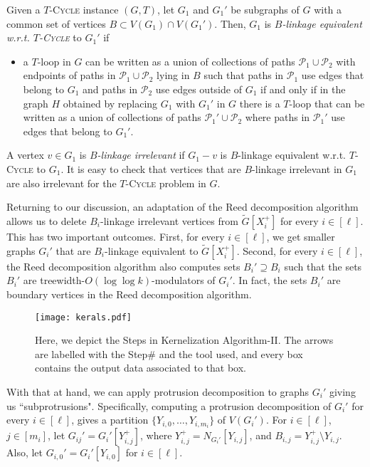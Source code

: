 \documentclass{article}
\numberwithin{claimcounter}{lemma}
\newcommand{\tcycle}{$T$-\textsc{Cycle}\xspace}
\begin{document}
 Given a \tcycle instance $(G,T)$, let $G_1$ and $G_1'$ be subgraphs of $G$ with a common set of vertices $B \subset V(G_1) \cap V(G_1')$. Then, $G_1$ is \emph{$B$-linkage equivalent  w.r.t. \tcycle} to $G_1'$ if 
\begin{itemize}
    \item a $T$-loop in $G$ can be written as a union of collections of paths $\mathcal{P}_1\cup \mathcal{P}_2$ with endpoints of paths in  $\mathcal{P}_1\cup \mathcal{P}_2$ lying in $B$ such that paths in $\mathcal{P}_1$ use edges that belong to $G_1$ and paths in $\mathcal{P}_2$ use edges outside of $G_1$ if and only if in the graph $H$ obtained by replacing $G_1$ with $G_1'$ in $G$ there is a $T$-loop that can be written as a  union of collections of paths $\mathcal{P}_1'\cup \mathcal{P}_2$ where paths in $\mathcal{P}_1'$ use edges that belong to $G_1'$.
\end{itemize}

    A vertex $v \in G_1$ is \emph{$B$-linkage irrelevant} if $G_1 - v$ is $B$-linkage equivalent w.r.t. \tcycle to $G_1$. It is easy to check that vertices that are $B$-linkage irrelevant in $G_1$ are also irrelevant for the \tcycle problem in $G$.

Returning to our discussion, an adaptation of the Reed decomposition algorithm allows us to delete $B_i$-linkage irrelevant vertices from $\tilde{G}[X_i^+]$ for every $i\in[\ell]$. This has two important outcomes. First, for every $i\in[\ell]$, we get smaller graphs $G_i'$ that are $B_i$-linkage equivalent to  $\tilde{G}[X_i^+]$. Second, for every $i\in [\ell]$, the Reed decomposition algorithm also computes sets $B_i' \supseteq B_i$ such that the sets $B_i'$ are treewidth-$O(\log \log k)$-modulators of $G_i'$. In fact, the sets $B_i'$ are boundary vertices in the Reed decomposition algorithm.   

\begin{figure}
\centering
\texttt{[image: kerals.pdf]}
\caption{Here, we depict the Steps in Kernelization Algorithm-II. The arrows are labelled with the Step$\#$ and the tool used, and every box contains the output data associated to that box.} \label{fig:kerfigtwo}

\end{figure}


With that at hand, we can apply protrusion decomposition to graphs $G_i'$ giving us ``subprotrusions". Specifically,  computing a protrusion decomposition of $G_i'$ for every $i\in[\ell]$, gives a partition $\{Y_{i,0},\dots,Y_{i,m_i}\}$ of $V(G_i')$. For $i \in [\ell]$, $j \in [m_i]$, let $G_{ij}' = G_i'[Y_{i,j}^+] $, where $Y_{i,j}^+ = N_{G_{i}'}[Y_{i,j}]$, and $B_{i,j} = Y_{i,j}^+ \setminus Y_{i,j}$. Also, let  $G_{i,0}' = G_i'[Y_{i,0}]$ for $i\in [\ell]$.  
\end{document}
